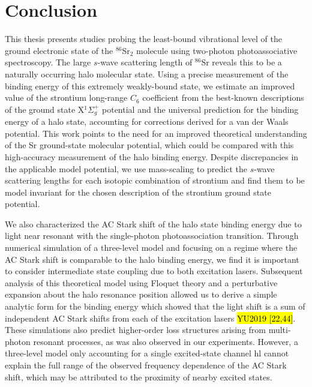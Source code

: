 \chapter{Conclusion} \label{ch:conclusion}
This thesis presents studies probing the least-bound vibrational level of the ground electronic state of the $^{86}$Sr$_2$ molecule using two-photon photoassociative spectroscopy.
The large $s$-wave scattering length of $^{86}$Sr reveals this to be a naturally occurring halo molecular state.
Using a precise measurement of the binding energy of this extremely weakly-bound state, we estimate an improved value of the strontium long-range $C_6$ coefficient from the best-known descriptions of the ground state X$^1\Sigma_g^+$ potential and the universal prediction for the binding energy of a halo state, accounting for corrections derived for a van der Waals potential.
This work points to the need for an improved theoretical understanding of the Sr ground-state molecular potential, which could be compared with this high-accuracy measurement of the halo binding energy.
Despite discrepancies in the applicable model potential, we use mass-scaling to predict the $s$-wave scattering lengths for each isotopic combination of strontium and find them to be model invariant for the chosen description of the strontium ground state potential.

We also characterized the AC Stark shift of the halo state binding energy due to light near resonant with the single-photon photoassociation transition. 
Through numerical simulation of a three-level model and focusing on a regime where the AC Stark shift is comparable to the halo binding energy, we find it is important to consider intermediate state coupling due to both excitation lasers.
Subsequent analysis of this theoretical model using Floquet theory and a perturbative expansion about the halo resonance position allowed us to derive a simple analytic form for the binding energy which showed that the light shift is a sum of independent AC Stark shifts from each of the excitation lasers \hl{YU2019 [22,44]}.
These simulations also predict higher-order loss structures arising from multi-photon resonant processes, as was also observed in our experiments.
However, a three-level model only accounting for a single excited-state channel hl{\hl{\cite{bju96}}} cannot explain the full range of the observed frequency dependence of the AC Stark shift, which may be attributed to the proximity of nearby excited states.

